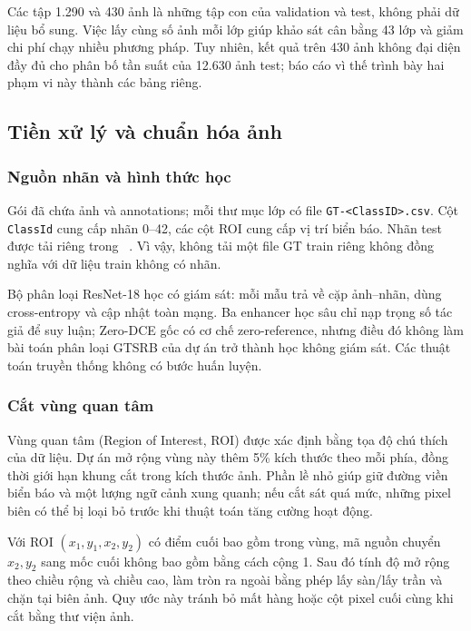 Các tập 1.290 và 430 ảnh là những tập con của validation và test, không phải dữ liệu bổ sung. Việc lấy cùng số ảnh mỗi lớp giúp khảo sát cân bằng 43 lớp và giảm chi phí chạy nhiều phương pháp. Tuy nhiên, kết quả trên 430 ảnh không đại diện đầy đủ cho phân bố tần suất của 12.630 ảnh test; báo cáo vì thế trình bày hai phạm vi này thành các bảng riêng.

\subsection{Tiền xử lý và chuẩn hóa ảnh}
\subsubsection{Nguồn nhãn và hình thức học}
Gói  đã chứa ảnh và annotations; mỗi thư mục lớp có file \texttt{GT-<ClassID>.csv}. Cột \texttt{ClassId} cung cấp nhãn 0--42, các cột ROI cung cấp vị trí biển báo. Nhãn test được tải riêng trong ~\cite{gtsrbdata}. Vì vậy, không tải một file GT train riêng không đồng nghĩa với dữ liệu train không có nhãn.

Bộ phân loại ResNet-18 học có giám sát: mỗi mẫu trả về cặp ảnh--nhãn, dùng cross-entropy và cập nhật toàn mạng. Ba enhancer học sâu chỉ nạp trọng số tác giả để suy luận; Zero-DCE gốc có cơ chế zero-reference, nhưng điều đó không làm bài toán phân loại GTSRB của dự án trở thành học không giám sát. Các thuật toán truyền thống không có bước huấn luyện.

\subsubsection{Cắt vùng quan tâm}
Vùng quan tâm (Region of Interest, ROI) được xác định bằng tọa độ chú thích của dữ liệu. Dự án mở rộng vùng này thêm 5\% kích thước theo mỗi phía, đồng thời giới hạn khung cắt trong kích thước ảnh. Phần lề nhỏ giúp giữ đường viền biển báo và một lượng ngữ cảnh xung quanh; nếu cắt sát quá mức, những pixel biên có thể bị loại bỏ trước khi thuật toán tăng cường hoạt động.

Với ROI $(x_1,y_1,x_2,y_2)$ có điểm cuối bao gồm trong vùng, mã nguồn chuyển $x_2,y_2$ sang mốc cuối không bao gồm bằng cách cộng 1. Sau đó tính độ mở rộng theo chiều rộng và chiều cao, làm tròn ra ngoài bằng phép lấy sàn/lấy trần và chặn tại biên ảnh. Quy ước này tránh bỏ mất hàng hoặc cột pixel cuối cùng khi cắt bằng thư viện ảnh.

